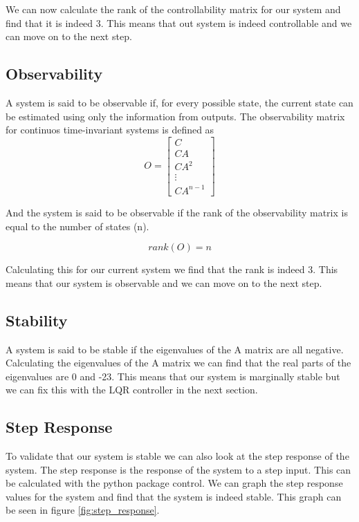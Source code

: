 \documentclass{scrartcl}
\begin{document}
We can now calculate the rank of the controllability matrix for our system and find that it is indeed 3. This means that out system is indeed controllable and we can move on to the next step.

\subsection{Observability}
A system is said to be observable if, for every possible state, the current state can be estimated using only the information from outputs.
The observability matrix for continuos time-invariant systems is defined as
\begin{equation}
    \mathit{O} = \begin{bmatrix}
        C      \\
        CA     \\
        CA^2   \\
        \vdots \\
        CA^{n-1}
    \end{bmatrix}
\end{equation}

And the system is said to be observable if the rank of the observability matrix is equal to the number of states (n).

\begin{equation}
    \mathit{rank}(\mathit{O}) = n
\end{equation}

Calculating this for our current system we find that the rank is indeed 3. This means that our system is observable and we can move on to the next step.

\subsection{Stability}
A system is said to be stable if the eigenvalues of the A matrix are all negative.
Calculating the eigenvalues of the A matrix we can find that the real parts of the eigenvalues are 0 and -23. This means that our system is marginally stable but we can fix this with the LQR controller in the next section.

\subsection{Step Response}
To validate that our system is stable we can also look at the step response of the system.
The step response is the response of the system to a step input.
This can be calculated with the python package control.
We can graph the step response values for the system and find that the system is indeed stable. This graph can be seen in figure \ref{fig:step_response}.
\end{document}
